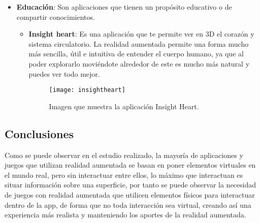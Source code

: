 \begin{itemize}
\begin{itemize}
  \end{itemize}

  \item \textbf{Educación}: Son aplicaciones que tienen un propósito educativo o de compartir conocimientos.

  \begin{itemize}
    \item \textbf{Insight heart}: Es una aplicación que te permite ver en 3D el corazón y sistema circulatorio. La realidad aumentada permite una forma mucho más sencilla, útil e intuitiva de entender el cuerpo humano, ya que al poder explorarlo moviéndote alrededor de este es mucho más natural y puedes ver todo mejor.

    \begin{figure}[h]
      \centering
      \texttt{[image: insightheart]}
      \caption{Imagen que muestra la aplicación Insight Heart.\protect\footnotemark}
      \label{figura-insight-heart}
    \end{figure}

  \end{itemize}
\end{itemize}

\subsection{Conclusiones}
Como se puede observar en el estudio realizado, la mayoría de aplicaciones y juegos que utilizan realidad aumentada se basan en poner elementos virtuales en el mundo real, pero sin interactuar entre ellos, lo máximo que interactuan es situar información sobre una superficie, por tanto se puede observar la necesidad de juegos con realidad aumentada que utilicen elementos físicos para interactuar dentro de la app, de forma que no toda interacción sea virtual, creando así una experiencia más realista y manteniendo los aportes de la realidad aumentada.
